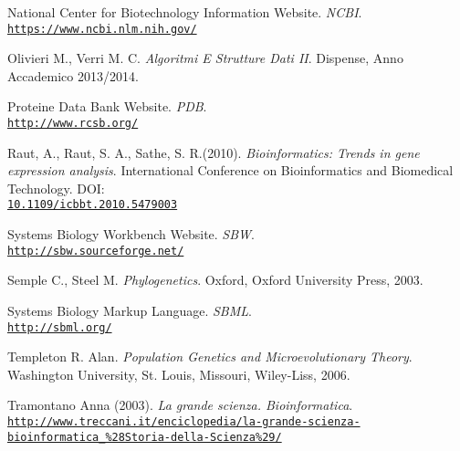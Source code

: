 \documentclass[twoside,openright,titlepage,fleqn,
,	headinclude,12pt,a4paper,BCOR5mm,footinclude,table]{scrbook}
\newcommand{\?}{'\-\nobreak\hspace{0pt}}
\begin{document}
\begin{thebibliography}{50}
National Center for Biotechnology Information Website.\newline
\textit{NCBI}.
\\\texttt{\url{https://www.ncbi.nlm.nih.gov/}}

Olivieri M., Verri M. C.\newline
\textit{Algoritmi E Strutture Dati II}.\newline
Dispense, Anno Accademico 2013/2014.

Proteine Data Bank Website.\newline
\textit{PDB}.
\\\texttt{\url{http://www.rcsb.org/}}

Raut, A., Raut, S. A., Sathe, S. R.(2010). \newline
\textit{Bioinformatics: Trends in gene expression analysis}.\newline
International Conference on Bioinformatics and Biomedical Technology.\newline
DOI:\\\texttt{\url{10.1109/icbbt.2010.5479003}}

Systems Biology Workbench Website.\newline
\textit{SBW}.
\\\texttt{\url{http://sbw.sourceforge.net/}}

Semple C., Steel M.\newline
\textit{Phylogenetics}.\newline
Oxford, Oxford University Press, 2003.

Systems Biology Markup Language.\newline
\textit{SBML}.
\\\texttt{\url{http://sbml.org/}}

Templeton R. Alan.\newline
\textit{Population Genetics and Microevolutionary Theory}.\newline
Washington University, St. Louis, Missouri, Wiley-Liss, 2006.

Tramontano Anna (2003).\newline
\textit{La grande scienza. Bioinformatica}.
\\\texttt{\url{http://www.treccani.it/enciclopedia/la-grande-scienza-bioinformatica_\%28Storia-della-Scienza\%29/}}

\end{thebibliography}


\end{document}
